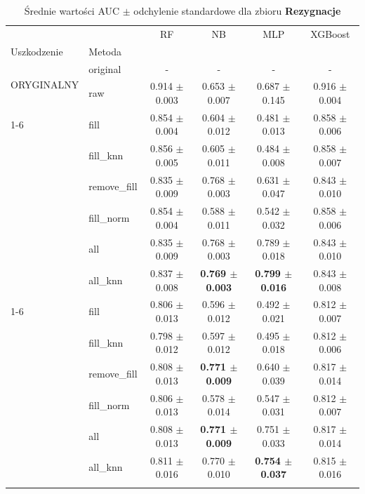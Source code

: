 \begin{table}[htbp]
\caption{Średnie wartości AUC $\pm$ odchylenie standardowe dla zbioru \textbf{Rezygnacje}}
\label{tab:wyniki_rezygnacje}
\begin{tabular}{llcccc}
\toprule
 &  & RF & NB & MLP & XGBoost \\
Uszkodzenie & Metoda &  &  &  &  \\
\midrule
\multirow[t]{2}{*}{ORYGINALNY} & original & - & - & - & - \\
 & raw & 0.914 $\pm$ 0.003 & 0.653 $\pm$ 0.007 & 0.687 $\pm$ 0.145 & 0.916 $\pm$ 0.004 \\
\cline{1-6}
\multirow[t]{7}{*}{10%
 & fill & 0.854 $\pm$ 0.004 & 0.604 $\pm$ 0.012 & 0.481 $\pm$ 0.013 & 0.858 $\pm$ 0.006 \\
 & fill_knn & 0.856 $\pm$ 0.005 & 0.605 $\pm$ 0.011 & 0.484 $\pm$ 0.008 & 0.858 $\pm$ 0.007 \\
 & remove_fill & 0.835 $\pm$ 0.009 & 0.768 $\pm$ 0.003 & 0.631 $\pm$ 0.047 & 0.843 $\pm$ 0.010 \\
 & fill_norm & 0.854 $\pm$ 0.004 & 0.588 $\pm$ 0.011 & 0.542 $\pm$ 0.032 & 0.858 $\pm$ 0.006 \\
 & all & 0.835 $\pm$ 0.009 & 0.768 $\pm$ 0.003 & 0.789 $\pm$ 0.018 & 0.843 $\pm$ 0.010 \\
 & all_knn & 0.837 $\pm$ 0.008 & \textbf{0.769 $\pm$ 0.003} & \textbf{0.799 $\pm$ 0.016} & 0.843 $\pm$ 0.008 \\
\cline{1-6}
\multirow[t]{7}{*}{20%
 & fill & 0.806 $\pm$ 0.013 & 0.596 $\pm$ 0.012 & 0.492 $\pm$ 0.021 & 0.812 $\pm$ 0.007 \\
 & fill_knn & 0.798 $\pm$ 0.012 & 0.597 $\pm$ 0.012 & 0.495 $\pm$ 0.018 & 0.812 $\pm$ 0.006 \\
 & remove_fill & 0.808 $\pm$ 0.013 & \textbf{0.771 $\pm$ 0.009} & 0.640 $\pm$ 0.039 & 0.817 $\pm$ 0.014 \\
 & fill_norm & 0.806 $\pm$ 0.013 & 0.578 $\pm$ 0.014 & 0.547 $\pm$ 0.031 & 0.812 $\pm$ 0.007 \\
 & all & 0.808 $\pm$ 0.013 & \textbf{0.771 $\pm$ 0.009} & 0.751 $\pm$ 0.033 & 0.817 $\pm$ 0.014 \\
 & all_knn & 0.811 $\pm$ 0.016 & 0.770 $\pm$ 0.010 & \textbf{0.754 $\pm$ 0.037} & 0.815 $\pm$ 0.016 \\
}}
\end{tabular}
\end{table}
